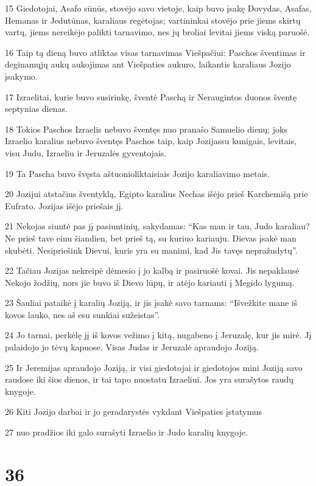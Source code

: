 \par 15 Giedotojai, Asafo sūnūs, stovėjo savo vietoje, kaip buvo įsakę Dovydas, Asafas, Hemanas ir Jedutūnas, karaliaus regėtojas; vartininkai stovėjo prie jiems skirtų vartų, jiems nereikėjo palikti tarnavimo, nes jų broliai levitai jiems viską paruošė. 
\par 16 Taip tą dieną buvo atliktas visas tarnavimas Viešpačiui: Paschos šventimas ir deginamųjų aukų aukojimas ant Viešpaties aukuro, laikantis karaliaus Jozijo įsakymo. 
\par 17 Izraelitai, kurie buvo susirinkę, šventė Paschą ir Neraugintos duonos šventę septynias dienas. 
\par 18 Tokios Paschos Izraelis nebuvo šventęs nuo pranašo Samuelio dienų; joks Izraelio karalius nebuvo šventęs Paschos taip, kaip Jozijas­su kunigais, levitais, visu Judu, Izraeliu ir Jeruzalės gyventojais. 
\par 19 Ta Pascha buvo švęsta aštuonioliktaisiais Jozijo karaliavimo metais. 
\par 20 Jozijui atstačius šventyklą, Egipto karalius Nechas išėjo prieš Karchemišą prie Eufrato. Jozijas išėjo priešais jį. 
\par 21 Nekojas siuntė pas jį pasiuntinių, sakydamas: “Kas man ir tau, Judo karaliau? Ne prieš tave einu šiandien, bet prieš tą, su kuriuo kariauju. Dievas įsakė man skubėti. Nesipriešink Dievui, kuris yra su manimi, kad Jis tavęs nepražudytų”. 
\par 22 Tačiau Jozijas nekreipė dėmesio į jo kalbą ir pasiruošė kovai. Jis nepaklausė Nekojo žodžių, nors jie buvo iš Dievo lūpų, ir atėjo kariauti į Megido lygumą. 
\par 23 Šauliai pataikė į karalių Joziją, ir jis įsakė savo tarnams: “Išvežkite mane iš kovos lauko, nes aš esu sunkiai sužeistas”. 
\par 24 Jo tarnai, perkėlę jį iš kovos vežimo į kitą, nugabeno į Jeruzalę, kur jis mirė. Jį palaidojo jo tėvų kapuose. Visas Judas ir Jeruzalė apraudojo Joziją. 
\par 25 Ir Jeremijas apraudojo Joziją, ir visi giedotojai ir giedotojos mini Joziją savo raudose iki šios dienos, ir tai tapo nuostatu Izraeliui. Jos yra surašytos raudų knygoje. 
\par 26 Kiti Jozijo darbai ir jo geradarystės vykdant Viešpaties įstatymus 
\par 27 nuo pradžios iki galo surašyti Izraelio ir Judo karalių knygoje.



\chapter{36}

